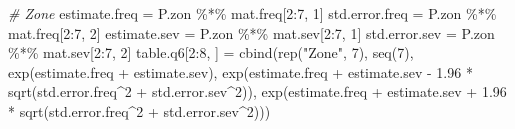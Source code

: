 \documentclass[
]{article}
\newenvironment{Shaded}{\begin{snugshade}}{\end{snugshade}}
\newcommand{\CommentTok}[1]{\textcolor[rgb]{0.56,0.35,0.01}{\textit{#1}}}
\newcommand{\DecValTok}[1]{\textcolor[rgb]{0.00,0.00,0.81}{#1}}
\newcommand{\FloatTok}[1]{\textcolor[rgb]{0.00,0.00,0.81}{#1}}
\newcommand{\FunctionTok}[1]{\textcolor[rgb]{0.00,0.00,0.00}{#1}}
\newcommand{\NormalTok}[1]{#1}
\newcommand{\OtherTok}[1]{\textcolor[rgb]{0.56,0.35,0.01}{#1}}
\newcommand{\SpecialCharTok}[1]{\textcolor[rgb]{0.00,0.00,0.00}{#1}}
\newcommand{\StringTok}[1]{\textcolor[rgb]{0.31,0.60,0.02}{#1}}
\begin{document}
\begin{Shaded}
\begin{Highlighting}[]
\CommentTok{\# Zone}
\NormalTok{estimate.freq }\OtherTok{=}\NormalTok{ P.zon }\SpecialCharTok{\%*\%}\NormalTok{ mat.freq[}\DecValTok{2}\SpecialCharTok{:}\DecValTok{7}\NormalTok{, }\DecValTok{1}\NormalTok{]}
\NormalTok{std.error.freq }\OtherTok{=}\NormalTok{ P.zon }\SpecialCharTok{\%*\%}\NormalTok{ mat.freq[}\DecValTok{2}\SpecialCharTok{:}\DecValTok{7}\NormalTok{, }\DecValTok{2}\NormalTok{]}
\NormalTok{estimate.sev }\OtherTok{=}\NormalTok{ P.zon }\SpecialCharTok{\%*\%}\NormalTok{ mat.sev[}\DecValTok{2}\SpecialCharTok{:}\DecValTok{7}\NormalTok{, }\DecValTok{1}\NormalTok{]}
\NormalTok{std.error.sev }\OtherTok{=}\NormalTok{ P.zon }\SpecialCharTok{\%*\%}\NormalTok{ mat.sev[}\DecValTok{2}\SpecialCharTok{:}\DecValTok{7}\NormalTok{, }\DecValTok{2}\NormalTok{]}
\NormalTok{table.q6[}\DecValTok{2}\SpecialCharTok{:}\DecValTok{8}\NormalTok{, ] }\OtherTok{=} \FunctionTok{cbind}\NormalTok{(}\FunctionTok{rep}\NormalTok{(}\StringTok{"Zone"}\NormalTok{, }\DecValTok{7}\NormalTok{), }\FunctionTok{seq}\NormalTok{(}\DecValTok{7}\NormalTok{), }\FunctionTok{exp}\NormalTok{(estimate.freq }\SpecialCharTok{+}\NormalTok{ estimate.sev), }
                  \FunctionTok{exp}\NormalTok{(estimate.freq }\SpecialCharTok{+}\NormalTok{ estimate.sev }\SpecialCharTok{{-}} \FloatTok{1.96} \SpecialCharTok{*} \FunctionTok{sqrt}\NormalTok{(std.error.freq}\SpecialCharTok{\^{}}\DecValTok{2} \SpecialCharTok{+}\NormalTok{ std.error.sev}\SpecialCharTok{\^{}}\DecValTok{2}\NormalTok{)), }
                  \FunctionTok{exp}\NormalTok{(estimate.freq }\SpecialCharTok{+}\NormalTok{ estimate.sev }\SpecialCharTok{+} \FloatTok{1.96} \SpecialCharTok{*} \FunctionTok{sqrt}\NormalTok{(std.error.freq}\SpecialCharTok{\^{}}\DecValTok{2} \SpecialCharTok{+}\NormalTok{ std.error.sev}\SpecialCharTok{\^{}}\DecValTok{2}\NormalTok{)))}


\end{Highlighting}
\end{Shaded}
\end{document}
